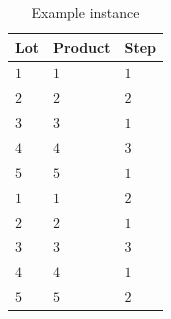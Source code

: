 \documentclass[runningheads]{llncs}
\begin{document}
\begin{table}[t]
	\caption{Example instance}\label{tab:instance} \centering
	\begin{tabular}{|l|l|l|}
		\hline
		Lot & Product & Step \\ \hline
		$1$ & $1$ & $1$ \\
		$2$ & $2$ & $2$  \\
		$3$ & $3$ & $1$ \\
		$4$ & $4$ & $3$ \\
		$5$ & $5$ & $1$ \\
		$1$ & $1$ & $2$     \\
		$2$ & $2$ & $1$  \\
		$3$ & $3$ & $3$        \\
		$4$ & $4$ & $1$     \\
		$5$ & $5$ & $2$  \\
		\hline
	\end{tabular}
\end{table}
%
\end{document}
